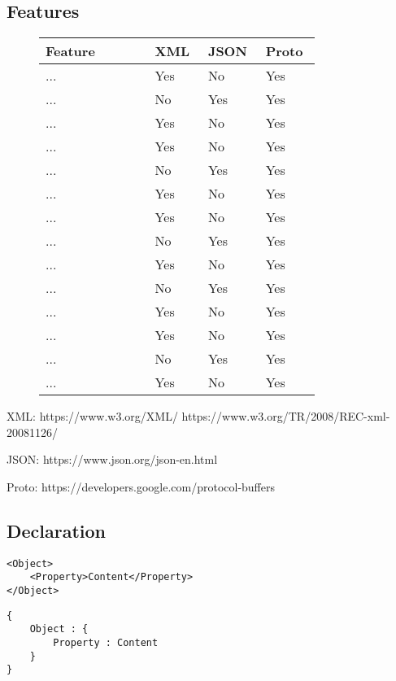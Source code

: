 \documentclass[../report.tex]{subfiles}
\begin{document}
\subsection{Features}

\begin{figure}[H]
\def\arraystretch{1.5}
\begin{tabular}{|p{0.35\linewidth}|p{0.15\linewidth}|p{0.15\linewidth}|p{0.15\linewidth}|}
\hline
Feature & XML & JSON & Proto \\
\hline
... & Yes & No & Yes \\ 
... & No & Yes & Yes \\ 
... & Yes & No & Yes \\ 
... & Yes & No & Yes \\ 
... & No & Yes & Yes \\ 
... & Yes & No & Yes \\ 
... & Yes & No & Yes \\ 
... & No & Yes & Yes \\ 
... & Yes & No & Yes \\ 
... & No & Yes & Yes \\ 
... & Yes & No & Yes \\ 
... & Yes & No & Yes \\ 
... & No & Yes & Yes \\ 
... & Yes & No & Yes \\ 
\hline
\end{tabular}
\end{figure}

XML: https://www.w3.org/XML/ https://www.w3.org/TR/2008/REC-xml-20081126/

JSON: https://www.json.org/json-en.html

Proto: https://developers.google.com/protocol-buffers

\pagebreak

\subsection{Declaration}

\begin{Verbatim}[frame=single,numbers=right,framesep=5mm,label=XML Object]
<Object>
    <Property>Content</Property>
</Object>
\end{Verbatim}

\vspace{1mm}

\begin{Verbatim}[frame=single,numbers=right,framesep=5mm,label=JSON Object]
{
    Object : {
        Property : Content
    }
}
\end{Verbatim}
\end{document}
